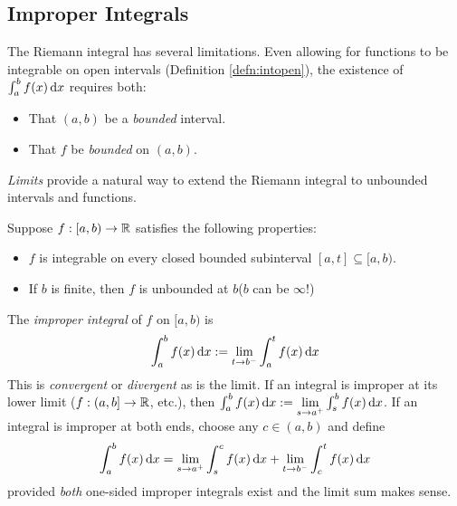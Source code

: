 \begin{exercises}
\begin{enumerate}
	
	\end{enumerate}
\end{exercises}


\clearpage


\setcounter{subsection}{35}
\subsection{Improper Integrals}\label{sec:improper}

The Riemann integral has several limitations. Even allowing for functions to be integrable on open intervals (Definition \ref{defn:intopen}), the existence of $\int_a^bf(x)\,{\mathrm{d} x}$ requires both:
\begin{itemize}
  \item That $(a,b)$ be a \emph{bounded} interval.
  \item That $f$ be \emph{bounded} on $(a,b)$.
\end{itemize}
\emph{Limits} provide a natural way to extend the Riemann integral to unbounded intervals and functions.

\begin{defn}{}{}
	Suppose $f:[a,b)\to\mathbb{R}$ satisfies the following properties:
	\begin{itemize}
	  \item $f$ is integrable on every closed bounded subinterval $[a,t]\subseteq [a,b)$.
	  \item If $b$ is finite, then $f$ is unbounded at $b$\quad ($b$ can be $\infty$!)
	\end{itemize}
	The \emph{improper integral} of $f$ on $[a,b)$ is
	\[
		\int_a^bf(x)\,{\mathrm{d} x} :=\lim_{t\to b^-}\int_a^tf(x)\,{\mathrm{d} x}
	\]
	This is \emph{convergent} or \emph{divergent} as is the limit.\smallbreak
	If an integral is improper at its lower limit ($f:(a,b]\to\mathbb{R}$, etc.), then $\int_a^bf(x)\,{\mathrm{d} x}:=\lim\limits_{s\to a^+}\int_s^bf(x)\,{\mathrm{d} x}$.\smallbreak
	If an integral is improper at both ends, choose any $c\in(a,b)$ and define
	\[
		\int_a^bf(x)\,{\mathrm{d} x} 
		=\lim_{s\to a^+}\int_s^cf(x)\,{\mathrm{d} x}
		+\lim_{t\to b^-}\int_c^tf(x)\,{\mathrm{d} x}
	\]
	provided \emph{both} one-sided improper integrals exist and the limit sum makes sense.
\end{defn}

